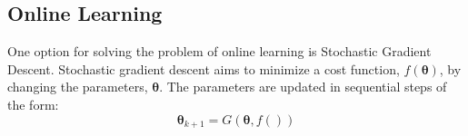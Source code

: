 \subsection{Online Learning}
  One option for solving the problem of online learning is Stochastic Gradient Descent.
  Stochastic gradient descent aims to minimize a cost function, $f(\mathbf{\theta})$, by changing the parameters, $\mathbf{\theta}$.
  The parameters are updated in sequential steps of the form:
  \begin{equation*}
    \mathbf{\theta}_{k + 1} = G(\mathbf{\theta}, f())
  \end{equation*}
